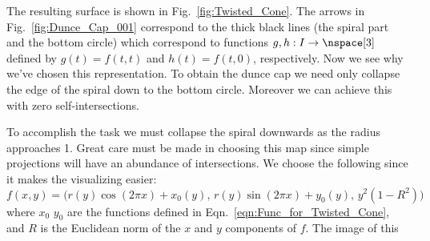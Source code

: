 \documentclass{book}                                                           %
\begin{document}
                \par
                \begin{minipage}[b]{0.54\textwidth}
                    The resulting surface is shown in
                    Fig.~\ref{fig:Twisted_Cone}. The arrows in
                    Fig.~\ref{fig:Dunce_Cap_001} correspond to the thick black
                    lines (the spiral part and the bottom circle) which
                    correspond to functions $g,h:I\rightarrow\nspace[3]$ defined
                    by $g(t)=f(t,t)$ and $h(t)=f(t,0)$, respectively. Now we see
                    why we've chosen this representation. To obtain the dunce
                    cap we need only collapse the edge of the spiral down to the
                    bottom circle. Moreover we can achieve this with zero
                    self-intersections.
                \end{minipage}
                \hfill
                \par\vspace{2.5ex}
                To accomplish the task we must collapse the spiral downwards as
                the radius approaches 1. Great care must be made in choosing
                this map since simple projections will have an abundance of
                intersections. We choose the following since it makes the
                visualizing easier:
                \begin{equation}
                    f(x,y)=\big(
                        r(y)\cos(2\pi{x})+x_{0}(y),\,
                        r(y)\sin(2\pi{x})+y_{0}(y),\,
                        y^{2}(1-R^{2})
                    \big)
                \end{equation}
                where $x_{0}$ $y_{0}$ are the functions defined in
                Eqn.~\ref{eqn:Func_for_Twisted_Cone}, and $R$ is the Euclidean
                norm of the $x$ and $y$ components of $f$. The image of this
\end{document}
